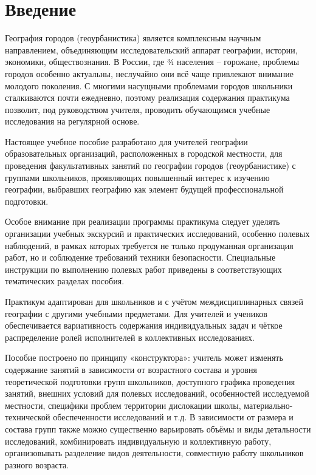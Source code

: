 \documentclass[
  11pt,
]{book}
\begin{document}
\chapter*{Введение}\label{ux432ux432ux435ux434ux435ux43dux438ux435}

География городов (геоурбанистика) является комплексным научным направлением, объединяющим исследовательский аппарат географии, истории, экономики, обществознания. В России, где ¾ населения -- горожане, проблемы городов особенно актуальны, неслучайно они всё чаще привлекают внимание молодого поколения. С многими насущными проблемами городов школьники сталкиваются почти ежедневно, поэтому реализация содержания практикума позволит, под руководством учителя, проводить обучающимся учебные исследования на регулярной основе.

Настоящее учебное пособие разработано для учителей географии образовательных организаций, расположенных в городской местности, для проведения факультативных занятий по географии городов (геоурбанистике) с группами школьников, проявляющих повышенный интерес к изучению географии, выбравших географию как элемент будущей профессиональной подготовки.

Особое внимание при реализации программы практикума следует уделять организации учебных экскурсий и практических исследований, особенно полевых наблюдений, в рамках которых требуется не только продуманная организация работ, но и соблюдение требований техники безопасности. Специальные инструкции по выполнению полевых работ приведены в соответствующих тематических разделах пособия.

Практикум адаптирован для школьников и с учётом междисциплинарных связей географии с другими учебными предметами. Для учителей и учеников обеспечивается вариативность содержания индивидуальных задач и чёткое распределение ролей исполнителей в коллективных исследованиях.

Пособие построено по принципу «конструктора»: учитель может изменять содержание занятий в зависимости от возрастного состава и уровня теоретической подготовки групп школьников, доступного графика проведения занятий, внешних условий для полевых исследований, особенностей исследуемой местности, специфики проблем территории дислокации школы, материально-технической обеспеченности исследований и т.д. В зависимости от размера и состава групп также можно существенно варьировать объёмы и виды детальности исследований, комбинировать индивидуальную и коллективную работу, организовывать разделение видов деятельности, совместную работу школьников разного возраста.
\end{document}
